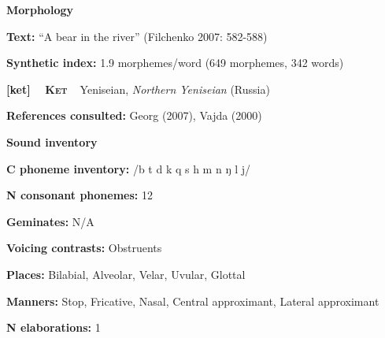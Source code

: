 \begin{styleBody}
\textbf{Morphology}
\end{styleBody}

\begin{styleBody}
\textbf{Text:} “A bear in the river” (Filchenko 2007: 582-588)
\end{styleBody}

\begin{styleBody}
\textbf{Synthetic index: }1.9 morphemes/word (649 morphemes, 342 words)
\end{styleBody}

\clearpage\begin{styleBody}
\textbf{[ket] }\ \ \textbf{\textsc{Ket}}\textbf{\ \ }Yeniseian, \textit{Northern Yeniseian} (Russia)
\end{styleBody}

\begin{styleBody}
\textbf{References consulted: }Georg (2007), Vajda (2000)
\end{styleBody}

\begin{styleBody}
\textbf{Sound inventory}
\end{styleBody}

\begin{styleBody}
\textbf{C phoneme inventory:} /b t d k q s h m n ŋ l j/
\end{styleBody}

\begin{styleBody}
\textbf{N consonant phonemes:} 12
\end{styleBody}

\begin{styleBody}
\textbf{Geminates:} N/A
\end{styleBody}

\begin{styleBody}
\textbf{Voicing contrasts:} Obstruents
\end{styleBody}

\begin{styleBody}
\textbf{Places:} Bilabial, Alveolar, Velar, Uvular, Glottal
\end{styleBody}

\begin{styleBody}
\textbf{Manners:} Stop, Fricative, Nasal, Central approximant, Lateral approximant
\end{styleBody}

\begin{styleBody}
\textbf{N elaborations:} 1
\end{styleBody}


